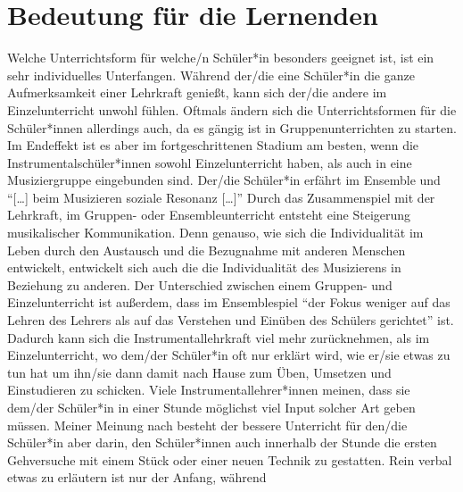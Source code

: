

\section{Bedeutung für die Lernenden}

Welche Unterrichtsform für welche/n Schüler*in besonders geeignet ist, ist ein
sehr individuelles Unterfangen. Während der/die eine Schüler*in die ganze
Aufmerksamkeit einer Lehrkraft genießt, kann sich der/die andere im
Einzelunterricht unwohl fühlen. Oftmals ändern sich die
Unterrichtsformen für die Schüler*innen allerdings auch, da es gängig ist in
Gruppenunterrichten zu starten. Im Endeffekt ist es aber im fortgeschrittenen
Stadium am besten, wenn die Instrumentalschüler*innen sowohl Einzelunterricht
haben, als auch in eine Musiziergruppe eingebunden sind. Der/die Schüler*in
erfährt im Ensemble und \enquote{[…] beim Musizieren soziale Resonanz […]}
\autocite[28]{mitzscherlich:musikpsychologie} Durch das Zusammenspiel mit der
Lehrkraft, im Gruppen- oder Ensembleunterricht entsteht eine Steigerung
musikalischer Kommunikation. \autocite[99]{mitzscherlich:musikpsychologie} Denn
genauso, wie sich die Individualität im Leben durch den Austausch und die
Bezugnahme mit anderen Menschen entwickelt, entwickelt sich auch die die
Individualität des Musizierens in Beziehung zu anderen. Der Unterschied zwischen
einem Gruppen- und Einzelunterricht ist außerdem, dass im Ensemblespiel
\enquote{der Fokus weniger auf das Lehren des Lehrers als auf das Verstehen und
Einüben des Schülers gerichtet} ist.
\autocite[31]{losert:die_kunst_zu_unterrichten} Dadurch kann sich die
Instrumentallehrkraft viel mehr zurücknehmen, als im Einzelunterricht, wo
dem/der Schüler*in oft nur erklärt wird, wie er/sie etwas zu tun hat um ihn/sie
dann damit nach Hause zum Üben, Umsetzen und Einstudieren zu schicken. Viele
Instrumentallehrer*innen meinen, dass sie dem/der Schüler*in in einer Stunde
möglichst viel Input solcher Art geben müssen. Meiner Meinung nach besteht der
bessere Unterricht für den/die Schüler*in aber darin, den Schüler*innen auch
innerhalb der Stunde die ersten Gehversuche mit einem Stück oder einer neuen
Technik zu gestatten. Rein verbal etwas zu erläutern ist nur der Anfang, während
